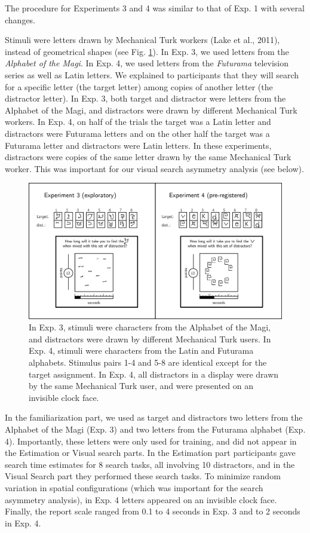 \documentclass[12pt,twoside]{reedthesis}
\begin{document}
The procedure for Experiments 3 and 4 was similar to that of Exp. 1 with several changes.

Stimuli were letters drawn by Mechanical Turk workers (Lake et al., 2011), instead of geometrical shapes (see Fig. \ref{fig:MVS-methods2}). In Exp. 3, we used letters from the \emph{Alphabet of the Magi}. In Exp. 4, we used letters from the \emph{Futurama} television series as well as Latin letters. We explained to participants that they will search for a specific letter (the target letter) among copies of another letter (the distractor letter). In Exp. 3, both target and distractor were letters from the Alphabet of the Magi, and distractors were drawn by different Mechanical Turk workers. In Exp. 4, on half of the trials the target was a Latin letter and distractors were Futurama letters and on the other half the target was a Futurama letter and distractors were Latin letters. In these experiments, distractors were copies of the same letter drawn by the same Mechanical Turk worker. This was important for our visual search asymmetry analysis (see below).
\begin{figure}

{\centering \includegraphics[width=1\linewidth]{figure/MVS/methods2} 

}

\caption[Experimental design for Experiments 3 and 4.]{In Exp. 3, stimuli were characters from the Alphabet of the Magi, and distractors were drawn by different Mechanical Turk users. In Exp. 4, stimuli were characters from the Latin and Futurama alphabets. Stimulus pairs 1-4 and 5-8 are identical except for the target assignment. In Exp. 4, all distractors in a display were drawn by the same Mechanical Turk user, and were presented on an invisible clock face.}\label{fig:MVS-methods2}
\end{figure}
In the familiarization part, we used as target and distractors two letters from the Alphabet of the Magi (Exp. 3) and two letters from the Futurama alphabet (Exp. 4). Importantly, these letters were only used for training, and did not appear in the Estimation or Visual search parts. In the Estimation part participants gave search time estimates for 8 search tasks, all involving 10 distractors, and in the Visual Search part they performed these search tasks. To minimize random variation in spatial configurations (which was important for the search asymmetry analysis), in Exp. 4 letters appeared on an invisible clock face. Finally, the report scale ranged from 0.1 to 4 seconds in Exp. 3 and to 2 seconds in Exp. 4.
\end{document}
